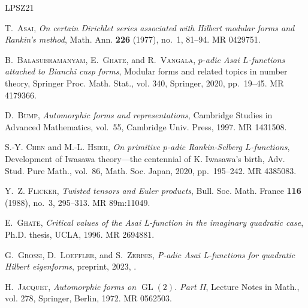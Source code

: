 \documentclass[a4paper,10pt]{amsart}
\theoremstyle{plain}
\theoremstyle{remark}
\numberwithin{equation}{section}
\begin{document}
\providecommand{\bysame}{\leavevmode\hbox to3em{\hrulefill}\thinspace}
\renewcommand{\MR}[1]{%
 MR \href{http://www.ams.org/mathscinet-getitem?mr=#1}{#1}.
}
\providecommand{\href}[2]{#2}
\newcommand{\articlehref}[2]{\href{#1}{#2}}
\begin{thebibliography}{LPSZ21}

\textsc{T.~Asai}, \articlehref{http://doi.org/10.1007/BF01391220}{\emph{On
  certain {D}irichlet series associated with {H}ilbert modular forms and
  {R}ankin's method}}, Math. Ann. \textbf{226} (1977), no.~1, 81--94.
  \MR{0429751}

\textsc{B.~Balasubramanyam, E.~Ghate,} and \textsc{R.~Vangala},
  \emph{{$p$}-adic {A}sai {$L$}-functions attached to {B}ianchi cusp forms},
  Modular forms and related topics in number theory, Springer Proc. Math.
  Stat., vol. 340, Springer, 2020, pp.~19--45. \MR{4179366}

\textsc{D.~Bump},
  \articlehref{http://doi.org/10.1017/CBO9780511609572}{\emph{Automorphic forms
  and representations}}, Cambridge Studies in Advanced Mathematics, vol.~55,
  Cambridge Univ. Press, 1997. \MR{1431508}

\textsc{S.-Y. Chen} and \textsc{M.-L. Hsieh}, \articlehref{https://doi.org/10.2969/aspm/08610195}{\emph{On primitive {$p$}-adic
  {R}ankin-{S}elberg {$L$}-functions}}, Development of {I}wasawa theory---the
  centennial of {K}. {I}wasawa's birth, Adv. Stud. Pure Math., vol.~86, Math.
  Soc. Japan, 2020, pp.~195--242. \MR{4385083}

\textsc{Y.~Z. Flicker},
  \articlehref{http://doi.org/10.24033/bsmf.2099}{\emph{Twisted tensors and
  {Euler} products}}, Bull. Soc. Math. France \textbf{116} (1988), no.~3,
  295--313. \MR{89m:11049}

\textsc{E.~Ghate}, \emph{Critical values of the {A}sai {L}-function in the
  imaginary quadratic case}, Ph.D. thesis, UCLA, 1996. \MR{2694881}

\textsc{G.~Grossi, D.~Loeffler,} and \textsc{S.~Zerbes},
  \articlehref{http://arxiv.org/abs/2307.07004}{\emph{P-adic {A}sai
  {L}-functions for quadratic {H}ilbert eigenforms}}, preprint, 2023,
  .

\textsc{H.~Jacquet},
  \articlehref{http://doi.org/10.1007/BFb0058503}{\emph{Automorphic forms on
  {$\operatorname{GL}(2)$}. {P}art {II}}}, Lecture Notes in Math., vol. 278,
  Springer, Berlin, 1972. \MR{0562503}


\end{thebibliography}
\end{document}
